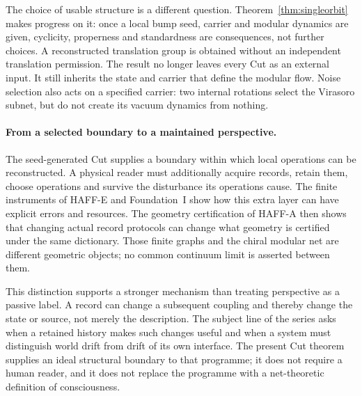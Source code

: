 \documentclass[12pt]{article}
\theoremstyle{definition}
\theoremstyle{remark}
\begin{document}
The choice of usable structure is a different question. Theorem~\ref{thm:singleorbit}
makes progress on it: once a local bump seed, carrier and modular dynamics are
given, cyclicity, properness and standardness are consequences, not further
choices. A reconstructed translation group is obtained without an independent
translation permission. The result no longer leaves every Cut as an external
input. It still inherits the state and carrier that define the modular flow.
Noise selection also acts on a specified carrier: two internal rotations
select the Virasoro subnet, but do not create its vacuum dynamics from nothing.

\paragraph{From a selected boundary to a maintained perspective.}
The seed-generated Cut supplies a boundary within which local operations can
be reconstructed. A physical reader must additionally acquire records, retain
them, choose operations and survive the disturbance its operations cause.
The finite instruments of HAFF-E and Foundation~I show how this extra layer
can have explicit errors and resources. The geometry certification of HAFF-A
then shows that changing actual record protocols can change what geometry is
certified under the same dictionary. Those finite graphs and the chiral
modular net are different geometric objects; no common continuum limit is
asserted between them.

This distinction supports a stronger mechanism than treating perspective as
a passive label. A record can change a subsequent coupling and thereby change
the state or source, not merely the description. The subject line of the
series asks when a retained history makes such changes useful and when a
system must distinguish world drift from drift of its own interface. The
present Cut theorem supplies an ideal structural boundary to that programme;
it does not require a human reader, and it does not replace the programme
with a net-theoretic definition of consciousness.
\end{document}
